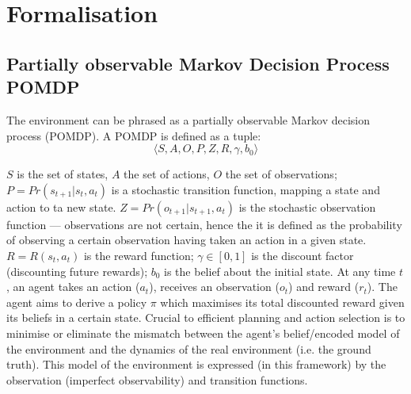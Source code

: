 \section{Formalisation} \label{MDP/POMDP}
\subsection{Partially observable Markov Decision Process POMDP}
The environment can be phrased as a partially observable Markov decision process (POMDP). 
A POMDP is defined as a tuple: 
\begin{equation}
    \langle S, A, O, P, Z, R, \gamma, b_0 \rangle
\end{equation}

\noindent$S$ is the set of states, $A$ the set of actions, $O$ the set of observations; 
\newline \newline  
$P = Pr(s_{t+1}|s_t, a_t)$ is a stochastic transition function, mapping a state and action to ta new state. \newline \newline 
 $Z = Pr(o_{t+1}|s_{t+1},a_{t})$ is the stochastic observation function --- observations are not certain, hence the it is defined as the probability of observing a certain observation having taken an action in a given state. 
 \newline \newline
 $R = R(s_t, a_t)$ is the reward function;
 \newline \newline
 $\gamma \in [0,1]$ is the discount factor (discounting future rewards);
 \newline \newline 
 $b_0$ is the belief about the initial state.
\newline \newline 
At any time $t$, an agent takes an action ($a_t$), receives an observation ($o_t$) and reward ($r_t$). The agent aims to derive a policy $\pi$ which maximises its total discounted reward given its beliefs in a certain state. 
\newline \newline
Crucial to efficient planning and action selection is to minimise or eliminate the mismatch between the agent's belief/encoded model of the environment and the dynamics of the real environment (i.e. the ground truth). This model of the environment is expressed (in this framework) by the observation (imperfect observability) and transition functions. 
